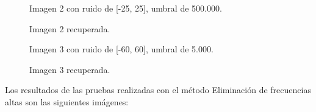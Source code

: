 \documentclass[10pt, a4paper]{article}
\begin{document}
\begin{itemize}
\begin{figure}[H] %
\hfill
\begin{minipage}[t]{.45\textwidth}
\begin{center}
\caption{Imagen 2 con ruido de [-25, 25], umbral de 500.000.}
\label{fig-tc1}
\end{center}
\end{minipage}
\hfill
\begin{minipage}[t]{.45\textwidth}
\begin{center}
\caption{Imagen 2 recuperada.}
\label{fig-tc2}
\end{center}
\end{minipage}
\hfill
\end{figure}

\begin{figure}[H] %
\hfill
\begin{minipage}[t]{.45\textwidth}
\begin{center}
\caption{Imagen 3 con ruido de [-60, 60], umbral de 5.000.}
\label{fig-tc1}
\end{center}
\end{minipage}
\hfill
\begin{minipage}[t]{.45\textwidth}
\begin{center}
\caption{Imagen 3 recuperada.}
\label{fig-tc2}
\end{center}
\end{minipage}
\hfill
\end{figure}


Los resultados de las pruebas realizadas con el método Eliminación de frecuencias altas son las siguientes imágenes:\newline


\end{itemize}
\end{document}

